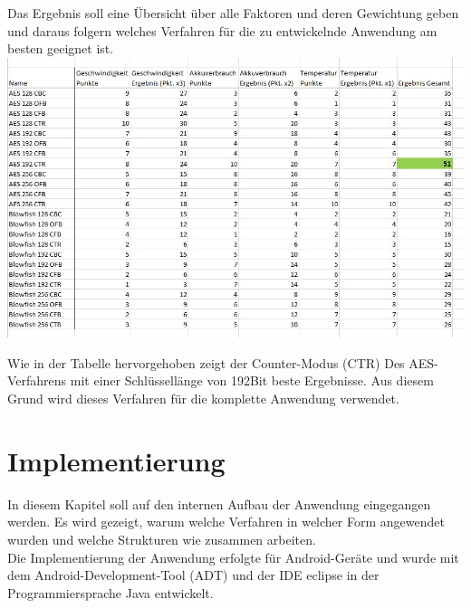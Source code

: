 \documentclass[10pt, a4paper,headsepline]{scrreprt}
\begin{document}
Das Ergebnis soll eine Übersicht über alle Faktoren und deren Gewichtung geben und daraus folgern welches Verfahren für die zu entwickelnde Anwendung am besten geeignet ist.  \\

\includegraphics[scale=0.65]{tabelle_Cryptovergleich_einzeln.JPG}
\hfill

Wie in der Tabelle hervorgehoben zeigt der Counter-Modus (CTR) Des AES-Verfahrens mit einer Schlüssellänge von 192Bit beste Ergebnisse. Aus diesem Grund wird dieses Verfahren für die komplette Anwendung verwendet.


\chapter{Implementierung}
In diesem Kapitel soll auf den internen Aufbau der Anwendung eingegangen werden. Es wird gezeigt, warum welche Verfahren in welcher Form angewendet wurden und welche Strukturen wie zusammen arbeiten. \\
Die Implementierung der Anwendung erfolgte für Android-Geräte und wurde mit dem Android-Development-Tool (ADT) und der IDE eclipse in der Programmiersprache Java entwickelt.  
\end{document}
